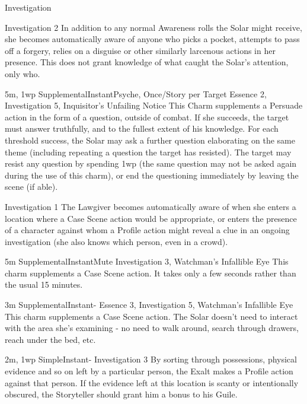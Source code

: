 \begin{Ability}{Investigation}

  {Investigation 2}
  In addition to any normal Awareness rolls the Solar might receive, she becomes automatically aware of anyone who picks a pocket, attempts to pass off a forgery, relies on a disguise or other similarly larcenous actions in her presence. This does not grant knowledge of what caught the Solar's attention, only who.

  {5m, 1wp}
  {Supplemental}{Instant}{Psyche, Once/Story per Target}
  {Essence 2, Investigation 5, Inquisitor's Unfailing Notice}
  This Charm supplements a Persuade action in the form of a question, outside of combat. If she succeeds, the target must answer truthfully, and to the fullest extent of his knowledge. For each threshold success, the Solar may ask a further question elaborating on the same theme (including repeating a question the target has resisted). The target may resist any question by spending 1wp (the same question may not be asked again during the use of this charm), or end the questioning immediately by leaving the scene (if able).

  {Investigation 1}
  The Lawgiver becomes automatically aware of when she enters a location where a Case Scene action would be appropriate, or enters the presence of a character against whom a Profile action might reveal a clue in an ongoing investigation (she also knows which person, even in a crowd).

  {5m}
  {Supplemental}{Instant}{Mute}
  {Investigation 3, Watchman's Infallible Eye}
  This charm supplements a Case Scene action. It takes only a few seconds rather than the usual 15 minutes.

  {3m}
  {Supplemental}{Instant}{-}
  {Essence 3, Investigation 5, Watchman's Infallible Eye}
  This charm supplements a Case Scene action. The Solar doesn't need to interact with the area she's examining - no need to walk around, search through drawers, reach under the bed, etc.

  {2m, 1wp}
  {Simple}{Instant}{-}
  {Investigation 3}
  By sorting through possessions, physical evidence and so on left by a particular person, the Exalt makes a Profile action against that person. If the evidence left at this location is scanty or intentionally obscured, the Storyteller should grant him a bonus to his Guile.


\end{Ability}
